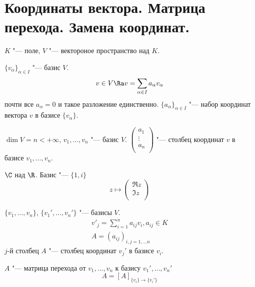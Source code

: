 ﻿\section[Коор-ты вектора. Матрица перехода. Замена коор-т]{Координаты вектора. Матрица перехода. Замена координат.}

\begin{Def}
	$K$ "---  поле, $V$ "--- вектороное пространство над $K$.

	$\{v_{\alpha}\}_{\alpha \in I}$ "--- базис $V$.
	\[ v \in V \Ra v = \sum_{\alpha \in I}a_{\alpha}v_{\alpha} \]
	почти все $a_{\alpha} = 0$ и такое разложение единственно.
	$\{a_{\alpha}\}_{\alpha \in I}$ "--- набор координат вектора $v$ в базисе $\{v_{\alpha}\}$.
\end{Def}

\begin{Def}
	$\dim V = n < +\infty$, $v_1, \dots, v_n$ "--- базис $V$.
	$
		\begin{pmatrix}
			a_1\\
			\vdots\\
		a_n\\
		\end{pmatrix}
	$ "--- столбец координат $v$ в базисе $v_1, \dots, v_n$.
\end{Def}

\begin{exmp}
	$\C$ над $\R$. Базис "--- $\{1, i\}$
	\[
		z \mapsto
		\begin{pmatrix}
			\Re z\\
			\Im z\\
		\end{pmatrix}
	\]
\end{exmp}

\begin{Def}
	$\{v_1, \dots, v_n\}$, $\{v_1', \dots, v_n'\}$ "--- базисы $V$.
	\begin{gather*}
		v'_j = \sum_{i = 1}^{n}a_{ij}v_i, a_{ij}\in K \\
		A = (a_{ij})_{i, j = 1, \dots n}
	\end{gather*}
	$j$-й столбец $A$ "--- столбец координат $v_j'$ в базисе $v_i$.

	$A$ "--- матрица перехода от $v_1, \dots, v_n$ к базису $v_1', \dots, v_n'$
	\[ A = [A]_{\{v_i\} \to \{v_i'\}} \]
\end{Def}

